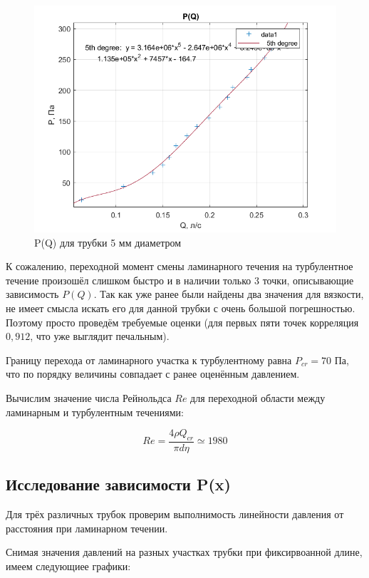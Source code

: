 \documentclass[a4paper, 12pt]{article} %
\begin{document}
\begin{figure}[!h]
    \centering
    \includegraphics[width = 12 cm]{5mm}
    \caption{P(Q) для трубки 5 мм диаметром}
    \label{fig:vac}
\end{figure}

К сожалению, переходной момент смены ламинарного течения на турбулентное течение произошёл слишком быстро и в наличии только 3 точки, описывающие зависимость $P(Q)$. Так как уже ранее были найдены два значения для вязкости, не имеет смысла искать его для данной трубки с очень большой погрешностью. Поэтому просто проведём требуемые оценки (для первых пяти точек корреляция $0,912$, что уже выглядит печальным).

Границу перехода от ламинарного участка к турбулентному равна $P_{cr} = 70$ Па, что по порядку величины совпадает с ранее оценённым давлением.

Вычислим значение числа Рейнольдса $Re$ для переходной области между ламинарным и турбулентным течениями:

\begin{equation}
    Re = \frac{4 \rho Q_{cr}}{\pi d \eta} \simeq 1980
\end{equation}

\subsection{Исследование зависимости P(x)}

Для трёх различных трубок проверим выполнимость линейности давления от расстояния при ламинарном течении.

Снимая значения давлений на разных участках трубки при фиксирвоанной длине, имеем следующиее графики:
\end{document}

